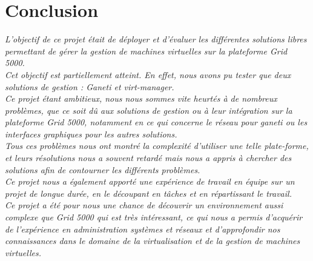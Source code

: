 \chapter{Conclusion}
\emph{L'objectif de ce projet était de déployer et d'évaluer les différentes solutions libres permettant de gérer la gestion de machines virtuelles sur la plateforme Grid 5000.\\
Cet objectif est partiellement atteint. En effet, nous avons pu tester que deux solutions de gestion : Ganeti et virt-manager.\\
Ce projet étant ambitieux, nous nous sommes vite heurtés à de nombreux problèmes, que ce soit dû aux solutions de gestion ou à leur intégration sur la plateforme Grid 5000, notamment en ce qui concerne le réseau pour ganeti ou les interfaces graphiques pour les autres solutions.\\
Tous ces problèmes nous ont montré la complexité d'utiliser une telle plate-forme, et leurs résolutions nous a souvent retardé mais nous a appris à chercher des solutions afin de contourner les différents problèmes.\\
Ce projet nous a également apporté une expérience de travail en équipe sur un projet de longue durée, en le découpant en tâches et en répartissant le travail.\\
Ce projet a été pour nous une chance de découvrir un environnement aussi complexe que Grid 5000 qui est très intéressant, ce qui nous a permis d'acquérir de l'expérience en administration systèmes et réseaux et d'approfondir nos connaissances dans le domaine de la virtualisation et de la gestion de machines virtuelles.}
